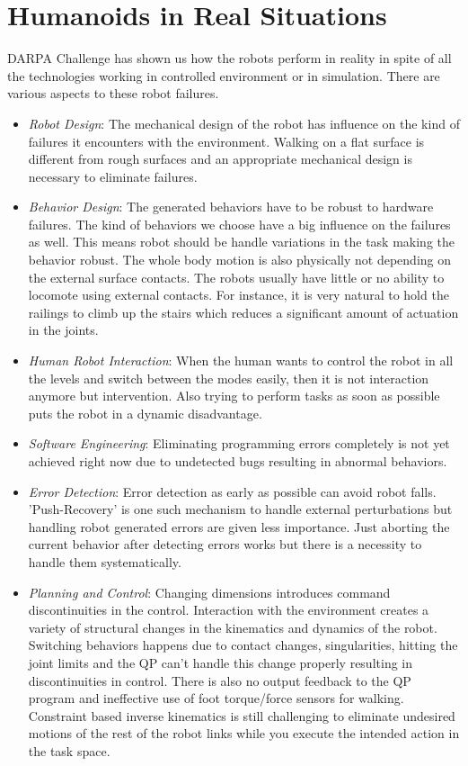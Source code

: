 \documentclass[a4paper,11pt,twoside]{StyleThese}
\begin{document}
\section{Humanoids in Real Situations}
DARPA Challenge has shown us how the robots perform in reality in spite of all the technologies working in controlled environment or in simulation. There are various aspects to these  robot failures.
\begin{itemize}
    \item \textit{Robot Design}: The mechanical design of the robot has influence on the kind of
    failures it encounters with the environment. Walking on a flat surface is different from rough surfaces and an appropriate mechanical design is necessary to eliminate failures.

    \item \textit{Behavior Design}: The generated behaviors have to be robust to hardware failures. The kind of behaviors we choose have a big influence on the failures as well. This means robot should be handle variations in the task making the behavior robust. The whole body motion is also physically not depending on the external surface contacts. The robots usually have little or no ability to locomote using external contacts. For instance, it is very natural to hold the railings to climb up the stairs which reduces a significant amount of actuation in the joints.
    \item \textit{Human Robot Interaction}: When the human wants to control the robot in all the levels and switch between the modes easily, then it is not interaction anymore but intervention. Also trying to perform tasks as soon as possible puts the robot in a dynamic disadvantage.       
    \item \textit{Software Engineering}: Eliminating programming errors completely is not yet achieved right now due to undetected bugs resulting in abnormal behaviors. 


    \item \textit{Error Detection}: Error detection as early as possible can avoid robot falls. 'Push-Recovery' is one such mechanism to handle external perturbations but handling robot generated errors are given less importance. Just aborting the current behavior after detecting errors works but there is a necessity to handle them systematically.  
    \item \textit{Planning and Control}: Changing dimensions introduces command discontinuities in the control. Interaction with the environment creates a variety of structural changes in the kinematics and dynamics of the robot. Switching behaviors happens due to contact changes, singularities, hitting the joint limits and the QP can't handle this change properly resulting in discontinuities in control. There is also no output feedback to the QP program and ineffective use of foot torque/force sensors for walking. Constraint based inverse kinematics is still challenging to eliminate undesired motions of the rest of the robot links while you execute the intended action in the task space.   
\end{itemize}
\end{document}

